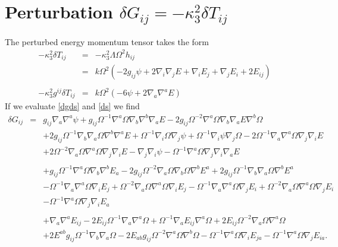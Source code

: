 \documentclass[10pt,letterpaper]{article}
\numberwithin{equation}{section}
\begin{document}
\section{Perturbation $\delta G_{ij} = -\kappa^2_3 \delta T_{ij}$}
The perturbed energy momentum tensor takes the form
\begin{eqnarray}
-\kappa_3^2 \delta T_{ij} &=& -\kappa^2_3 \Lambda \Omega^2 h_{ij}
\nonumber\\
&=& k \Omega^2 (-2 g_{ij}\psi + 2\nabla_i\nabla_j E + \nabla_i E_j + \nabla_j E_i + 2E_{ij})
\nonumber\\ \nonumber\\
-\kappa_3^2 g^{ij} \delta T_{ij} &=& k\Omega^2(-6\psi + 2\nabla_a\nabla^a E)
\end{eqnarray}
If we evaluate \eqref{dgds} and \eqref{ds} we find 
\begin{eqnarray}
\delta G_{ij}&=&g_{ij} \nabla_{a}\nabla^{a}\psi
 + g_{ij} \Omega^{-1} \nabla^{a}\Omega \nabla_{b}\nabla^{b}\nabla_{a}E
 - 2 g_{ij} \Omega^{-2} \nabla^{a}\Omega \nabla_{b}\nabla_{a}E \nabla^{b}\Omega\nonumber\\
&& + 2 g_{ij} \Omega^{-1} \nabla_{b}\nabla_{a}\Omega \nabla^{b}\nabla^{a}E
 + \Omega^{-1} \nabla_{i}\Omega \nabla_{j}\psi
 + \Omega^{-1} \nabla_{i}\psi \nabla_{j}\Omega
 - 2 \Omega^{-1} \nabla_{a}\nabla^{a}\Omega \nabla_{j}\nabla_{i}E\nonumber\\
&& + 2 \Omega^{-2} \nabla_{a}\Omega \nabla^{a}\Omega \nabla_{j}\nabla_{i}E
 -  \nabla_{j}\nabla_{i}\psi
 -  \Omega^{-1} \nabla^{a}\Omega \nabla_{j}\nabla_{i}\nabla_{a}E
\nonumber\\ \nonumber\\
&&+g_{ij} \Omega^{-1} \nabla^{a}\Omega \nabla_{b}\nabla^{b}E_{a}
 - 2 g_{ij} \Omega^{-2} \nabla_{a}\Omega \nabla_{b}\Omega \nabla^{b}E^{a}
 + 2 g_{ij} \Omega^{-1} \nabla_{b}\nabla_{a}\Omega \nabla^{b}E^{a}\nonumber\\
&& -  \Omega^{-1} \nabla_{a}\nabla^{a}\Omega \nabla_{i}E_{j}
 + \Omega^{-2} \nabla_{a}\Omega \nabla^{a}\Omega \nabla_{i}E_{j}
 -  \Omega^{-1} \nabla_{a}\nabla^{a}\Omega \nabla_{j}E_{i}
 + \Omega^{-2} \nabla_{a}\Omega \nabla^{a}\Omega \nabla_{j}E_{i}\nonumber\\
&& -  \Omega^{-1} \nabla^{a}\Omega \nabla_{j}\nabla_{i}E_{a}
\nonumber\\ \nonumber\\
&&+\nabla_{a}\nabla^{a}E_{ij}
 - 2 E_{ij} \Omega^{-1} \nabla_{a}\nabla^{a}\Omega
 + \Omega^{-1} \nabla_{a}E_{ij} \nabla^{a}\Omega
 + 2 E_{ij} \Omega^{-2} \nabla_{a}\Omega \nabla^{a}\Omega\nonumber\\
&& + 2 E^{ab} g_{ij} \Omega^{-1} \nabla_{b}\nabla_{a}\Omega
 - 2 E_{ab} g_{ij} \Omega^{-2} \nabla^{a}\Omega \nabla^{b}\Omega
 -  \Omega^{-1} \nabla^{a}\Omega \nabla_{i}E_{ja}
 -  \Omega^{-1} \nabla^{a}\Omega \nabla_{j}E_{ia}.
\end{eqnarray}
\end{document}
